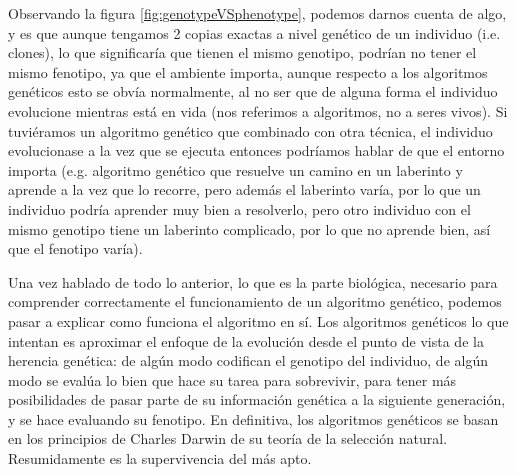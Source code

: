 Observando la figura \ref{fig:genotypeVSphenotype}, podemos darnos cuenta de algo, y es que aunque tengamos 2 copias exactas a nivel genético de un individuo (i.e. clones), lo que significaría que tienen el mismo genotipo, podrían no tener el mismo fenotipo, ya que el ambiente importa, aunque respecto a los algoritmos genéticos esto se obvía normalmente, al no ser que de alguna forma el individuo evolucione mientras está en vida (nos referimos a algoritmos, no a seres vivos). Si tuviéramos un algoritmo genético que combinado con otra técnica, el individuo evolucionase a la vez que se ejecuta entonces podríamos hablar de que el entorno importa (e.g. algoritmo genético que resuelve un camino en un laberinto y aprende a la vez que lo recorre, pero además el laberinto varía, por lo que un individuo podría aprender muy bien a resolverlo, pero otro individuo con el mismo genotipo tiene un laberinto complicado, por lo que no aprende bien, así que el fenotipo varía).

Una vez hablado de todo lo anterior, lo que es la parte biológica, necesario para comprender correctamente el funcionamiento de un algoritmo genético, podemos pasar a explicar como funciona el algoritmo en sí. Los algoritmos genéticos lo que intentan es aproximar el enfoque de la evolución desde el punto de vista de la herencia genética: de algún modo codifican el genotipo del individuo, de algún modo se evalúa lo bien que hace su tarea para sobrevivir, para tener más posibilidades de pasar parte de su información genética a la siguiente generación, y se hace evaluando su fenotipo. En definitiva, los algoritmos genéticos se basan en los principios de Charles Darwin de su teoría de la selección natural. Resumidamente es la supervivencia del más apto.

